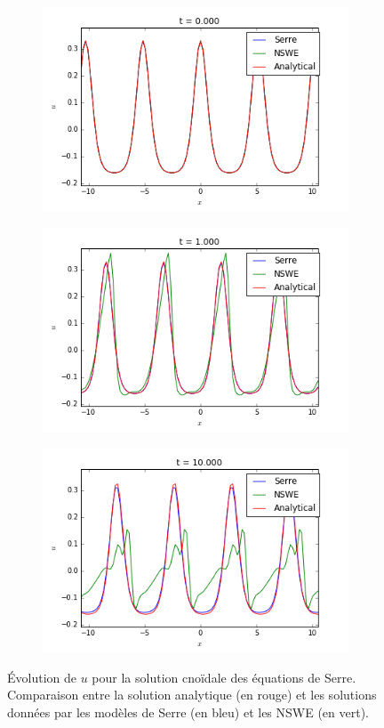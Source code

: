 \begin{figure}[h!]
	\begin{subfigure}{.3\linewidth}
		\includegraphics[scale=.3]{figures/Serre/4x4cnoidal1u.png}	
	\end{subfigure}
	\begin{subfigure}{.3\linewidth}
		\includegraphics[scale=.3]{figures/Serre/4x4cnoidal2u.png}	
	\end{subfigure}
	\begin{subfigure}{.3\linewidth}
		\includegraphics[scale=.3]{figures/Serre/4x4cnoidal3u.png}	
	\end{subfigure}
	\caption{Évolution de $u$ pour la solution cnoïdale des équations de Serre. Comparaison entre la solution analytique (en rouge) et les solutions données par les modèles de Serre (en bleu) et les NSWE (en vert).  \label{fig:cnoidalu}}
\end{figure}


